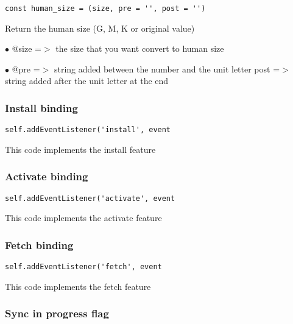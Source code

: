 \documentclass[a4paper]{article}
\begin{document}
\begin{lstlisting}
const human_size = (size, pre = '', post = '')
\end{lstlisting}

Return the human size (G, M, K or original value)

\begin{compactitem}
\item[\color{myblue}$\bullet$] @size  =$>$ the size that you want convert to human size
\item[\color{myblue}$\bullet$] @pre  =$>$ string added between the number and the unit letter
post  =$>$ string added after the unit letter at the end
\end{compactitem}

\hypertarget{toc830}{}
\subsubsection{Install binding}

\begin{lstlisting}
self.addEventListener('install', event
\end{lstlisting}

This code implements the install feature

\hypertarget{toc831}{}
\subsubsection{Activate binding}

\begin{lstlisting}
self.addEventListener('activate', event
\end{lstlisting}

This code implements the activate feature

\hypertarget{toc832}{}
\subsubsection{Fetch binding}

\begin{lstlisting}
self.addEventListener('fetch', event
\end{lstlisting}

This code implements the fetch feature

\hypertarget{toc833}{}
\subsubsection{Sync in progress flag}
\end{document}
